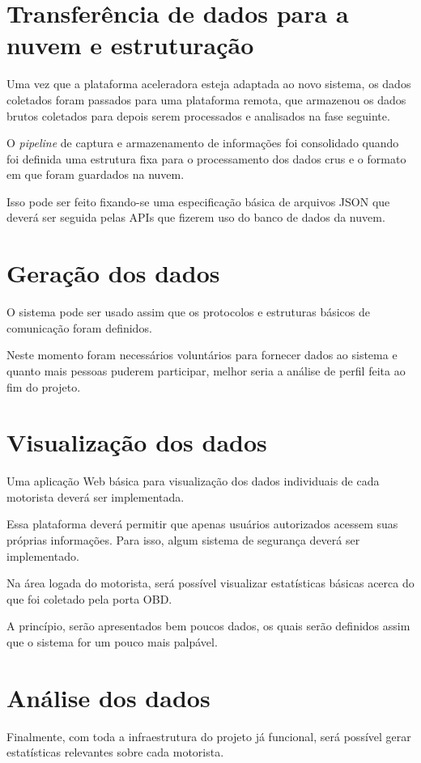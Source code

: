 \section{Transferência de dados para a nuvem e estruturação}
Uma vez que a plataforma aceleradora esteja adaptada ao novo sistema, os dados coletados foram passados para uma plataforma remota, que armazenou os dados brutos coletados para depois serem processados e analisados na fase seguinte.

O \textit{pipeline} de captura e armazenamento de informações foi consolidado quando foi definida uma estrutura fixa para o processamento dos dados crus e o formato em que foram guardados na nuvem.

Isso pode ser feito fixando-se uma especificação básica de arquivos JSON que deverá ser seguida pelas APIs que fizerem uso do banco de dados da nuvem.

\section{Geração dos dados}
O sistema pode ser usado assim que os protocolos e estruturas básicos de comunicação foram definidos. 

Neste momento foram necessários voluntários para fornecer dados ao sistema e quanto mais pessoas puderem participar, melhor seria a análise de perfil feita ao fim do projeto.

\section{Visualização dos dados}
Uma aplicação Web básica para visualização dos dados individuais de cada motorista deverá ser implementada.

Essa plataforma deverá permitir que apenas usuários autorizados acessem suas próprias informações. Para isso, algum sistema de segurança deverá ser implementado.

Na área logada do motorista, será possível visualizar estatísticas básicas acerca do que foi coletado pela porta OBD.

A princípio, serão apresentados bem poucos dados, os quais serão definidos assim que o sistema for um pouco mais palpável. 

\section{Análise dos dados}
Finalmente, com toda a infraestrutura do projeto já funcional, será possível gerar estatísticas relevantes sobre cada motorista.

